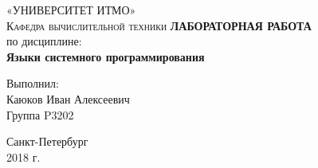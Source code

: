 \begin{titlepage}
\begin{center}

\textsc{«УНИВЕРСИТЕТ ИТМО»\\[4mm]
Кафедра вычислительной техники}
\vfill
\textbf{ЛАБОРАТОРНАЯ РАБОТА }\\[4mm]
по дисциплине:\\[2mm]
\textbf{Языки системного программирования}\\[16mm]
\end{center}

\begin{flushright}
Выполнил: \\[4mm]
Каюков Иван Алексеевич \\[2mm]
Группа P3202
\end{flushright}

\begin{center}
\vfill
Санкт-Петербург\\[2mm]
2018 г.

\end{center}
\end{titlepage}
